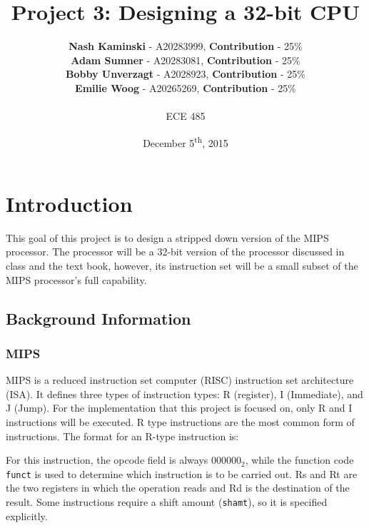 \documentclass[12pt]{article}
\title{\textbf{Project 3: Designing a 32-bit CPU}}
\author{\textbf{Nash Kaminski} - A20283999, \textbf{Contribution} - 25\% \\
	\textbf{Adam Sumner} - A20283081, \textbf{Contribution} - 25\% \\
		\textbf{Bobby Unverzagt} - A2028923, \textbf{Contribution} - 25\% \\
		\textbf{Emilie Woog} - A20265269, \textbf{Contribution} - 25\% \\
		 ~\\ ECE 485}
\date{December 5\textsuperscript{th}, 2015}
\begin{document}
\maketitle

\section{Introduction}
This goal of this project is to design a stripped down version of the MIPS processor. The processor will be a 32-bit version of the processor discussed in class and the text book, however, its instruction set will be a small subset of the MIPS processor's full capability. 

\subsection{Background Information}
\subsubsection{MIPS}
MIPS is a reduced instruction set computer (RISC) instruction set architecture (ISA). It defines three types of instruction types: R (register), I (Immediate), and J (Jump). For the implementation that this project is focused on, only R and I instructions will be executed. R type instructions are the most common form of instructions. The format for an R-type instruction is:

\begin{center}

\end{center}

\noindent For this instruction, the opcode field is always $000000_2$, while the function code \texttt{funct} is used to determine which instruction is to be carried out. Rs and Rt are the two registers in which the operation reads and Rd is the destination of the result. Some instructions require a shift amount (\texttt{shamt}), so it is specified explicitly.
\\
\end{document}
